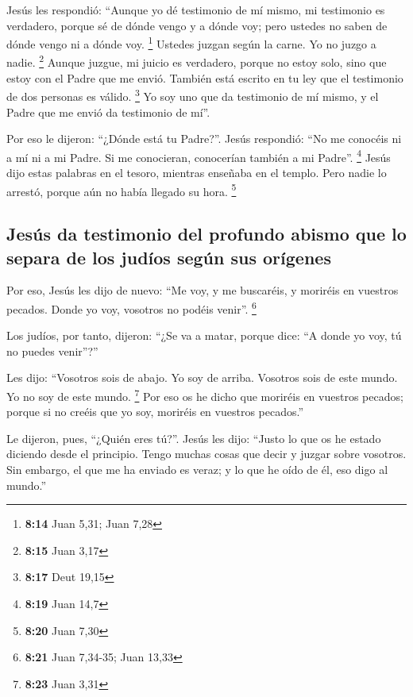  Jesús les respondió: ``Aunque yo dé testimonio de mí
mismo, mi testimonio es verdadero, porque sé de dónde vengo y a dónde
voy; pero ustedes no saben de dónde vengo ni a dónde voy. \footnote{\textbf{8:14}
  Juan 5,31; Juan 7,28}  Ustedes juzgan según la carne.
Yo no juzgo a nadie. \footnote{\textbf{8:15} Juan 3,17} 
Aunque juzgue, mi juicio es verdadero, porque no estoy solo, sino que
estoy con el Padre que me envió.  También está escrito en
tu ley que el testimonio de dos personas es válido. \footnote{\textbf{8:17}
  Deut 19,15}  Yo soy uno que da testimonio de mí mismo,
y el Padre que me envió da testimonio de mí''.

 Por eso le dijeron: ``¿Dónde está tu Padre?''. Jesús
respondió: ``No me conocéis ni a mí ni a mi Padre. Si me conocieran,
conocerían también a mi Padre''. \footnote{\textbf{8:19} Juan 14,7}
 Jesús dijo estas palabras en el tesoro, mientras
enseñaba en el templo. Pero nadie lo arrestó, porque aún no había
llegado su hora. \footnote{\textbf{8:20} Juan 7,30}

\hypertarget{jesuxfas-da-testimonio-del-profundo-abismo-que-lo-separa-de-los-juduxedos-seguxfan-sus-oruxedgenes}{%
\subsection{Jesús da testimonio del profundo abismo que lo separa de los
judíos según sus
orígenes}\label{jesuxfas-da-testimonio-del-profundo-abismo-que-lo-separa-de-los-juduxedos-seguxfan-sus-oruxedgenes}}

 Por eso, Jesús les dijo de nuevo: ``Me voy, y me
buscaréis, y moriréis en vuestros pecados. Donde yo voy, vosotros no
podéis venir''. \footnote{\textbf{8:21} Juan 7,34-35; Juan 13,33}

 Los judíos, por tanto, dijeron: ``¿Se va a matar, porque
dice: ``A donde yo voy, tú no puedes venir''?''

 Les dijo: ``Vosotros sois de abajo. Yo soy de arriba.
Vosotros sois de este mundo. Yo no soy de este mundo. \footnote{\textbf{8:23}
  Juan 3,31}  Por eso os he dicho que moriréis en
vuestros pecados; porque si no creéis que yo soy, moriréis en vuestros
pecados.''

 Le dijeron, pues, ``¿Quién eres tú?''. Jesús les dijo:
``Justo lo que os he estado diciendo desde el principio. 
Tengo muchas cosas que decir y juzgar sobre vosotros. Sin embargo, el
que me ha enviado es veraz; y lo que he oído de él, eso digo al mundo.''


